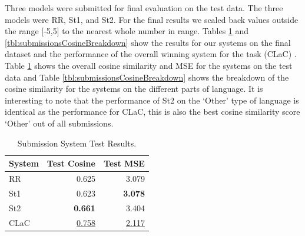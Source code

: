 \documentclass[11pt,letterpaper]{article}
\begin{document}
Three models were submitted for final evaluation on the test data. The three models were {\sc RR}, {\sc St1}, and {\sc St2}. For the final results we scaled back values outside the range [-5,5] to the nearest whole number in range. 
Tables \ref{tbl:submissionsTest} and \ref{tbl:submissionsCosineBreakdown} show the results for our systems on the final dataset and the performance of the overall winning system for the task ({\sc CLaC}) . Table \ref{tbl:submissionsTest} shows the overall cosine similarity and MSE for the systems on the test data and Table \ref{tbl:submissionsCosineBreakdown} shows the breakdown of the cosine similarity for the systems on the different parts of language. It is interesting to note that the performance of {\sc St2} on the `Other' type of language is identical as the performance for {\sc CLaC}, this is also the best cosine similarity score `Other' out of all submissions.


\begin{table}[ht!]
\begin{center}
\begin{tabular}{| l |  r | r | }
\hline
System  & Test Cosine & Test MSE\\
\hline
{\sc RR}  & 0.625 & 3.079\\
{\sc St1}  & 0.623 &{\bf  3.078}\\
{\sc St2} &  {\bf  0.661} & 3.404 \\
\hline
\hline
{\sc CLaC} & \underline{0.758} & \underline{2.117}\\
\hline
\end{tabular}
\end{center}
\caption{Submission System Test Results.\protect\footnotemark}
\label{tbl:submissionsTest}
\end{table}

\begin{table}[ht!]
\caption{Cosine Test Results Breakdown.}
\label{tbl:submissionsCosineBreakdown}
\end{table}
\end{document}

